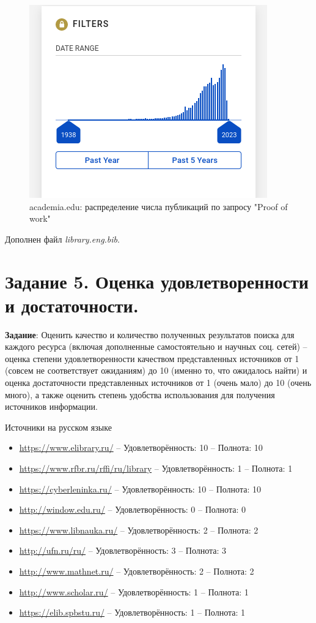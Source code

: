 \documentclass[a4paper, 12pt]{report}		%
\begin{document}
\begin{figure}[H]
 \centering
 \includegraphics[scale=0.6]{res/academia2}
 \caption{academia.edu: распределение числа публикаций по запросу "Proof of work"}
\end{figure}

Дополнен файл \textit{library.eng.bib}.

\chapter*{Задание 5. Оценка удовлетворенности и достаточности.}

\textbf{Задание}: Оценить качество и количество полученных результатов поиска для каждого ресурса (включая дополненные самостоятельно и научных соц. сетей) -- оценка степени удовлетворенности качеством представленных источников от 1 (совсем не соответствует ожиданиям) до 10 (именно то, что ожидалось найти) и оценка достаточности представленных источников от 1 (очень мало) до 10 (очень много), а также оценить степень удобства использования для получения источников информации.

Источники на русском языке
\begin{itemize}
\item \url{https://www.elibrary.ru/} -- Удовлетворённость: 10 -- Полнота: 10
\item \url{https://www.rfbr.ru/rffi/ru/library} -- Удовлетворённость: 1 -- Полнота: 1
\item \url{https://cyberleninka.ru/} -- Удовлетворённость: 10 -- Полнота: 10
\item \url{http://window.edu.ru/} -- Удовлетворённость: 0 -- Полнота: 0
\item \url{https://www.libnauka.ru/} -- Удовлетворённость: 2 -- Полнота: 2
\item \url{http://ufn.ru/ru/} -- Удовлетворённость: 3 -- Полнота: 3
\item \url{http://www.mathnet.ru/} -- Удовлетворённость: 2 -- Полнота: 2
\item \url{http://www.scholar.ru/} -- Удовлетворённость: 1 -- Полнота: 1
\item \url{https://elib.spbstu.ru/} -- Удовлетворённость: 1 -- Полнота: 1
\end{itemize}
\end{document}
